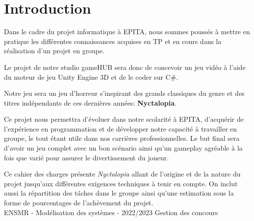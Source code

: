 \section{Introduction}
\setlength{\parindent}{5ex}
Dans le cadre du projet informatique à EPITA, nous sommes poussés à mettre en pratique les différentes connaissances acquises en TP et en cours dans la réalisation d'un projet en groupe.

Le projet de notre studio gameHUB sera donc de concevoir un jeu vidéo à l’aide du moteur de jeu Unity Engine 3D et de le coder sur C\#.

\setlength{\parindent}{5ex}
Notre jeu sera un jeu d’horreur s’inspirant des grands classiques du genre et des titres indépendants de ces dernières années: \textbf{Nyctalopia}.

\setlength{\parindent}{5ex}
Ce projet nous permettra d’évoluer dans notre scolarité à EPITA, d’acquérir de l'expérience en programmation et de développer notre capacité à travailler en groupe, le tout étant utile dans nos carrières professionnelles. Le but final sera d'avoir un jeu complet avec un bon scénario ainsi qu'un gameplay agréable à la fois que varié pour assurer le divertissement du joueur.

Ce cahier des charges présente \emph{Nyctalopia} allant de l'origine et de la nature du projet jusqu'aux différentes exigences techniques à tenir en compte. On inclut aussi la répartition des tâches dans le groupe ainsi qu'une estimation sous la forme de pourcentages de l'achèvement du projet.
\vfill
\noindent\makebox[\linewidth]{\rule{.8\paperwidth}{.6pt}}\\[0.2cm]
ENSMR - Modélisation des systèmes - 2022/2023 \hfill Gestion des concours
\noindent\makebox[\linewidth]{\rule{.8\paperwidth}{.6pt}}
\newpage